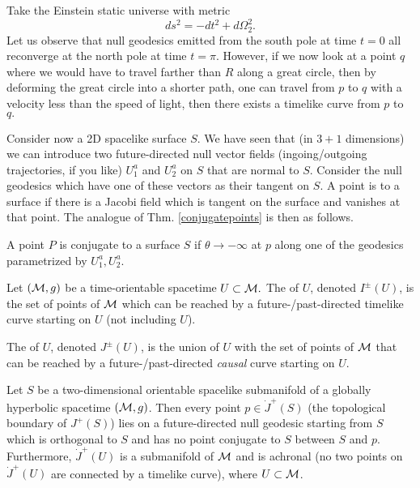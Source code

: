 \begin{exm}
    Take the Einstein static universe with metric 
    \begin{equation*}
        ds^2=-dt^2+d\Omega_2^2.
    \end{equation*}
    Let us observe that null geodesics emitted from the south pole at time $t=0$ all reconverge at the north pole at time $t=\pi$.
    However, if we now look at a point $q$ where we would have to travel farther than $R$ along a great circle, then by deforming the great circle into a shorter path, one can travel from $p$ to $q$ with a velocity less than the speed of light, then there exists a timelike curve from $p$ to $q.$
\end{exm}

Consider now a 2D spacelike surface $S$. We have seen that (in $3+1$ dimensions) we can introduce two future-directed null vector fields (ingoing/outgoing trajectories, if you like) $U^a_1$ and $U^a_2$ on $S$ that are normal to $S$. Consider the null geodesics which have one of these vectors as their tangent on $S$. A point is  to a surface if there is a Jacobi field which is tangent on the surface and vanishes at that point. The analogue of Thm. \ref{conjugatepoints} is then as follows.

\begin{thm}
    A point $P$ is conjugate to a surface $S$ if $\theta \to -\infty$ at $p$ along one of the geodesics parametrized by $U^a_1,U^a_2$.
\end{thm}

\begin{defn}
    Let $(\mathcal{M},g)$ be a time-orientable spacetime $U\subset{ \mathcal{M}}.$ The  of $U$, denoted $I^\pm(U)$, is the set of points of $\mathcal{M}$ which can be reached by a future-/past-directed timelike curve starting on $U$ (not including $U$).
\end{defn}
\begin{defn}
    The  of $U$, denoted $J^\pm(U)$, is the union of $U$ with the set of points of $\mathcal{M}$ that can be reached by a future-/past-directed \emph{causal} curve starting on $U$.
\end{defn}

\begin{thm}\label{surfaceconjugatepoints}
    Let $S$ be a two-dimensional orientable spacelike submanifold of a globally hyperbolic spacetime $(\mathcal{M},g)$. Then every point $p\in \dot J^+(S)$ (the topological boundary of $J^+(S)$) lies on a future-directed null geodesic starting from $S$ which is orthogonal to $S$ and has no point conjugate to $S$ between $S$ and $p$. Furthermore, $\dot J^+(U)$ is a submanifold of $\mathcal{M}$ and is achronal (no two points on $\dot J^+(U)$ are connected by a timelike curve), where $U\subset \mathcal{M}$.
\end{thm}
